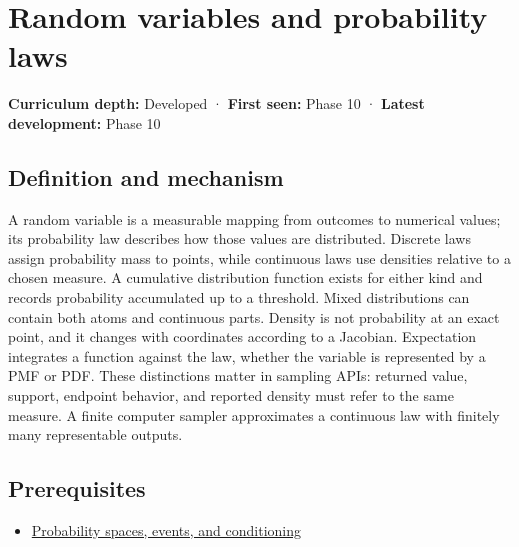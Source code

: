 \hypertarget{appendix-4d0203f7944f}{}\label{referencestart:appendix-4d0203f7944f}
\section{Random variables and probability laws}\label{appendix-4d0203f7944f-random-variables-and-probability-laws}

\hypertarget{appendix-4d0203f7944f-random-variables-and-probability-laws}{}

\textbf{Curriculum depth:} Developed · \textbf{First seen:} Phase 10 · \textbf{Latest development:} Phase 10

\begin{allmightroledefinition}

\subsection{Definition and mechanism}\label{appendix-4d0203f7944f-definition-and-mechanism}

\hypertarget{appendix-4d0203f7944f-definition-and-mechanism}{}

A random variable is a measurable mapping from outcomes to numerical values; its probability law describes how those values are distributed. Discrete laws assign probability mass to points, while continuous laws use densities relative to a chosen measure. A cumulative distribution function exists for either kind and records probability accumulated up to a threshold. Mixed distributions can contain both atoms and continuous parts. Density is not probability at an exact point, and it changes with coordinates according to a Jacobian. Expectation integrates a function against the law, whether the variable is represented by a PMF or PDF. These distinctions matter in sampling APIs: returned value, support, endpoint behavior, and reported density must refer to the same measure. A finite computer sampler approximates a continuous law with finitely many representable outputs.

\end{allmightroledefinition}

\subsection{Prerequisites}\label{appendix-4d0203f7944f-prerequisites}

\hypertarget{appendix-4d0203f7944f-prerequisites}{}

\begin{itemize}
\tightlist
\item
  \hyperref[appendix-f1ef323f6ed7]{Probability spaces, events, and conditioning}
\end{itemize}

